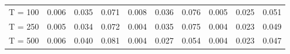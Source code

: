 % 
\begin{tabular}{cccccccccc}
  \hline
  \hline
T = 100 & 0.006 & 0.035 & 0.071 & 0.008 & 0.036 & 0.076 & 0.005 & 0.025 & 0.051 \\ 
  T = 250 & 0.005 & 0.034 & 0.072 & 0.004 & 0.035 & 0.075 & 0.004 & 0.023 & 0.049 \\ 
  T = 500 & 0.006 & 0.040 & 0.081 & 0.004 & 0.027 & 0.054 & 0.004 & 0.023 & 0.047 \\ 
   \hline
\end{tabular}
